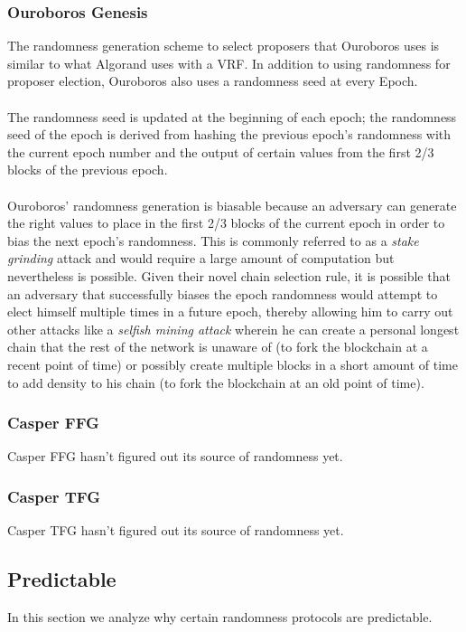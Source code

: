 \documentclass[10pt,journal,compsoc]{IEEEtran}
\newcommand\alberto[1]{\todo[color=yellow,inline]{\textbf{Alberto:} #1}}
\begin{document}
\subsubsection{Ouroboros Genesis}
The randomness generation scheme to select proposers that Ouroboros uses is similar to what Algorand uses with a VRF. In addition to using randomness for proposer election, Ouroboros also uses a randomness seed at every Epoch. 
\\\\
The randomness seed is updated at the beginning of each epoch; the randomness seed of the epoch is derived from hashing the previous epoch's randomness with the current epoch number and the output of certain values from the first 2/3 blocks of the previous epoch. 
\\\\ 
Ouroboros' randomness generation is biasable because an adversary can generate the right values to place in the first 2/3 blocks of the current epoch in order to bias the next epoch's randomness. This is commonly referred to as a \emph{stake grinding} attack and would require a large amount of computation but nevertheless is possible.  Given their novel chain selection rule, it is possible that an adversary that successfully biases the epoch randomness would attempt to elect himself multiple times in a future epoch, thereby allowing him to carry out other attacks like a \emph{selfish mining attack} wherein he can create a personal longest chain that the rest of the network is unaware of (to fork the blockchain at a recent point of time) or possibly create multiple blocks in a short amount of time to add density to his chain (to fork the blockchain at an old point of time).
\subsubsection{Casper FFG}
Casper FFG hasn't figured out its source of randomness yet.
\alberto{Explain Randao}

\subsubsection{Casper TFG}
Casper TFG hasn't figured out its source of randomness yet.

\subsection{Predictable}
In this section we analyze why certain randomness protocols are predictable. 
\end{document}
